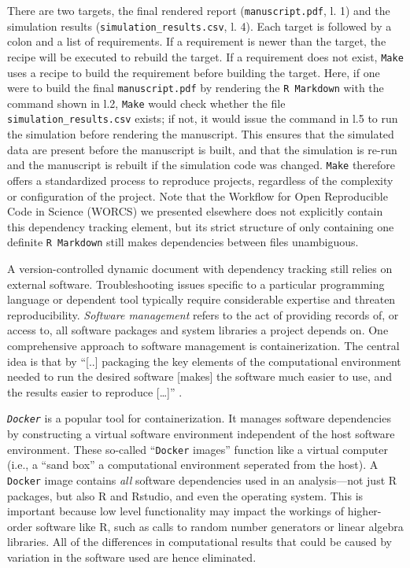 \documentclass[psych,tutorial,submit,moreauthors,pdftex]{mdpi}
\begin{document}
There are two targets, the final rendered report
(\texttt{manuscript.pdf}, l. 1) and the simulation results
(\texttt{simulation\_results.csv}, l. 4). Each target is followed by a
colon and a list of requirements. If a requirement is newer than the
target, the recipe will be executed to rebuild the target. If a
requirement does not exist, \texttt{Make} uses a recipe to build the
requirement before building the target. Here, if one were to build the
final \texttt{manuscript.pdf} by rendering the \texttt{R\ Markdown} with
the command shown in l.2, \texttt{Make} would check whether the file
\texttt{simulation\_results.csv} exists; if not, it would issue the
command in l.5 to run the simulation before rendering the manuscript.
This ensures that the simulated data are present before the manuscript
is built, and that the simulation is re-run and the manuscript is
rebuilt if the simulation code was changed. \texttt{Make} therefore
offers a standardized process to reproduce projects, regardless of the
complexity or configuration of the project. Note that the Workflow for
Open Reproducible Code in Science (WORCS) we presented elsewhere
\citep{vanlissa2020worcs} does not explicitly contain this dependency
tracking element, but its strict structure of only containing one
definite \texttt{R\ Markdown} still makes dependencies between files
unambiguous.

A version-controlled dynamic document with dependency tracking still
relies on external software. Troubleshooting issues specific to a
particular programming language or dependent tool typically require
considerable expertise and threaten reproducibility. \emph{Software
management} refers to the act of providing records of, or access to, all
software packages and system libraries a project depends on. One
comprehensive approach to software management is containerization. The
central idea is that by ``{[}..{]} packaging the key elements of the
computational environment needed to run the desired software {[}makes{]}
the software much easier to use, and the results easier to reproduce
{[}\ldots{]}'' \citep[p.~174]{silverSoftwareSimplified2017}.

\emph{\texttt{Docker}} is a popular tool for containerization. It
manages software dependencies by constructing a virtual software
environment independent of the host software environment. These
so-called ``\texttt{Docker} images'' function like a virtual computer
(i.e., a ``sand box'' a computational environment seperated from the
host). A \texttt{Docker} image contains \emph{all} software dependencies
used in an analysis---not just R packages, but also R and Rstudio, and
even the operating system. This is important because low level
functionality may impact the workings of higher-order software like R,
such as calls to random number generators or linear algebra libraries.
All of the differences in computational results that could be caused by
variation in the software used are hence eliminated.
\end{document}
